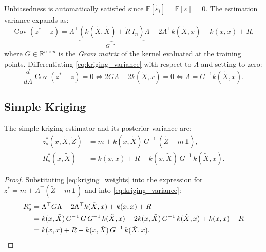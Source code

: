 Unbiasedness is automatically satisfied since $\mathbb{E}[\tilde\varepsilon_i]
= \mathbb{E}[\varepsilon] = 0$. The estimation variance expands as:
\begin{equation}
    \operatorname{Cov}(z^* - z)
    = \Lambda^\top \underbrace{\left(k(\tilde{X}, \tilde{X})
      + \tilde{R}\,I_{\tilde{n}}\right)}_{G\,\triangleq}\Lambda
    - 2\Lambda^\top k(\tilde{X}, x) + k(x,x) + R,
    \label{eq:kriging_variance}
\end{equation}
where $G \in \mathbb{R}^{\tilde{n} \times \tilde{n}}$ is the \emph{Gram
matrix} of the kernel evaluated at the training points. Differentiating
\eqref{eq:kriging_variance} with respect to $\Lambda$ and setting to zero:
\begin{equation}
    \frac{d}{d\Lambda}\operatorname{Cov}(z^* - z) = 0
    \iff 2G\Lambda - 2k(\tilde{X}, x) = 0
    \iff \Lambda = G^{-1} k(\tilde{X}, x).
    \label{eq:kriging_weights}
\end{equation}

\subsection{Simple Kriging}
\label{sec:simple_kriging}

\begin{proposition}
    \label{prop:simple_kriging}
    The simple kriging estimator and its posterior variance are:
    \begin{align}
        z^*_s(x, \tilde{X}, \tilde{Z})
        &= m + k(x, \tilde{X})\,G^{-1}\,(\tilde{Z} - m\,\mathbf{1}),
        \label{eq:simple_kriging_estimator} \\
        R^*_s(x, \tilde{X})
        &= k(x,x) + R - k(x, \tilde{X})\,G^{-1}\,k(\tilde{X}, x).
        \label{eq:simple_kriging_variance}
    \end{align}
\end{proposition}

\begin{proof}
    Substituting \eqref{eq:kriging_weights} into the expression for
    $z^* = m + \Lambda^\top(\tilde{Z} - m\,\mathbf{1})$ and into
    \eqref{eq:kriging_variance}:
    \begin{align}
        R^*_s &= \Lambda^\top G\Lambda - 2\Lambda^\top k(\tilde{X},x)
                 + k(x,x) + R \nonumber \\
               &= k(x,\tilde{X})\,G^{-1}\,G\,G^{-1}\,k(\tilde{X},x)
                  - 2k(x,\tilde{X})\,G^{-1}\,k(\tilde{X},x)
                  + k(x,x) + R \nonumber \\
               &= k(x,x) + R - k(x,\tilde{X})\,G^{-1}\,k(\tilde{X},x).
               \qedhere
    \end{align}
\end{proof}

